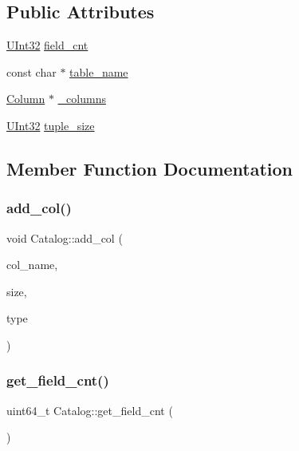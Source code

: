 \subsection*{Public Attributes}
\begin{DoxyCompactItemize}
\item 
\hyperlink{global_8h_a7e8aeec7b6541935dfc6f608cd5170ce}{U\+Int32} \hyperlink{classCatalog_abd9d27040300ad689ec3b21b46d78d44}{field\+\_\+cnt}
\item 
const char $\ast$ \hyperlink{classCatalog_aa6c66c1e792e3c6081e22fd669f84052}{table\+\_\+name}
\item 
\hyperlink{classColumn}{Column} $\ast$ \hyperlink{classCatalog_ae629f8b429ce660192d3dd2e51f493ea}{\+\_\+columns}
\item 
\hyperlink{global_8h_a7e8aeec7b6541935dfc6f608cd5170ce}{U\+Int32} \hyperlink{classCatalog_ac5c0f579ade64940d1c743b4ee76e657}{tuple\+\_\+size}
\end{DoxyCompactItemize}


\subsection{Member Function Documentation}
\mbox{\label{classCatalog_a82dd2169f7a07b9b0a112d3d05f4c78d}} 
\subsubsection{\texorpdfstring{add\+\_\+col()}{add\_col()}}
{\footnotesize\ttfamily void Catalog\+::add\+\_\+col (\begin{DoxyParamCaption}\item[{char $\ast$}]{col\+\_\+name,  }\item[{uint64\+\_\+t}]{size,  }\item[{char $\ast$}]{type }\end{DoxyParamCaption})}

\mbox{\label{classCatalog_a3a8d95b98c08cc5dcff8d7df7eed2285}} 
\subsubsection{\texorpdfstring{get\+\_\+field\+\_\+cnt()}{get\_field\_cnt()}}
{\footnotesize\ttfamily uint64\+\_\+t Catalog\+::get\+\_\+field\+\_\+cnt (\begin{DoxyParamCaption}{ }\end{DoxyParamCaption})\hspace{0.3cm}{\ttfamily [inline]}}


